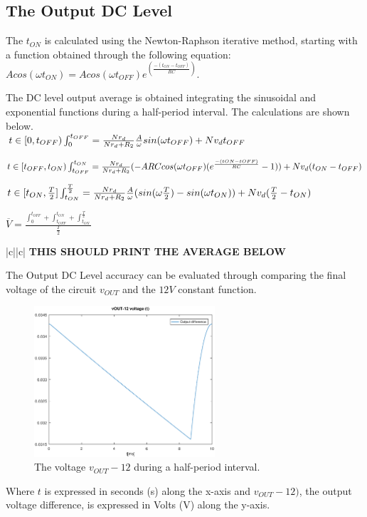 \subsection{The Output DC Level}
\label{subsec:dclevel}

The $t_{ON}$ is calculated using the Newton-Raphson iterative method, starting with a function obtained through the following equation: $Acos(\omega t_{ON})=Acos(\omega t_{OFF})e^(\frac{-(t_{ON}-t_{OFF})}{RC})$.

The DC level output average is obtained integrating the sinusoidal and exponential functions during a half-period interval. The calculations are shown below.\\

$t\in[0,t_{OFF})\\
\int_{0}^{t_{OFF}}=\frac{N r_d}{N r_d + R_2}\frac{A}{\omega}sin(\omega t_{OFF})+N v_d t_{OFF}\\$

$t\in[t_{OFF},t_{ON})\\
\int_{t_{OFF}}^{t_{ON}}=\frac{N r_d}{N r_d + R_2}(-A R C cos(\omega t_{OFF})(e^{\frac{-({tON}-{tOFF})}{RC}}-1))+N v_d (t_{ON} - t_{OFF})\\$

$t\in[t_{ON},\frac{T}{2}]\\
\int_{t_{ON}}^{\frac{T}{2}}=\frac{N r_d}{N r_d + R_2}\frac{A}{\omega}(sin(\omega \frac{T}{2})-sin(\omega t_{ON}))+N v_d (\frac{T}{2}-t_{ON})\\$

$\overline{V}=\frac{\int_{0}^{t_{OFF}}+\int_{t_{OFF}}^{t_{ON}}+\int_{t_{ON}}^{\frac{T}{2}}}{\frac{T}{2}}$

\begin{center}
   \begin{tabular}{|c||c|}
      \hline    
       {\bf THIS SHOULD PRINT THE AVERAGE BELOW} \\
      \hline
        
   \end{tabular}
 \end{center}

The Output DC Level accuracy can be evaluated through comparing the final voltage of the circuit $v_{OUT}$ and the $12 V$ constant function. 

\begin{figure}[H] \centering
\includegraphics[width=0.6\textwidth]{outputdiff.eps}
\caption{The voltage $v_{OUT}-12$ during a half-period interval.}
\label{fig:outputdiff}
\end{figure}

Where $t$ is expressed in seconds (s) along the x-axis and 
$v_{OUT}-12)$, the output voltage difference, is expressed in Volts (V) along the y-axis.

